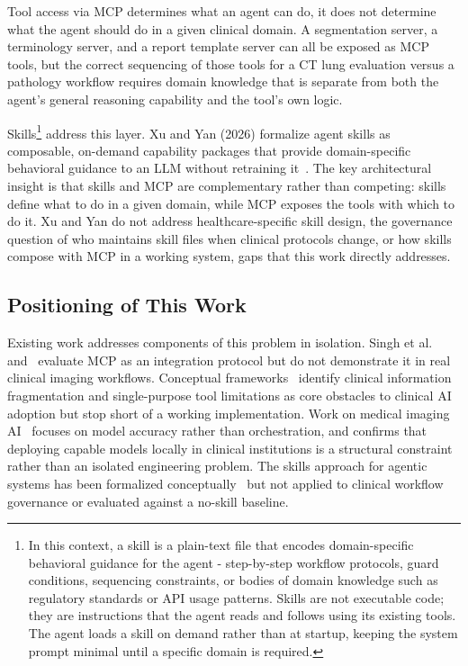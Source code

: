 \documentclass[conference]{IEEEtran}
\begin{document}
Tool access via MCP determines what an agent can do, it does not determine what the agent should do in a given clinical domain. A segmentation server, a terminology server, and a report template server can all be exposed as MCP tools, but the correct sequencing of those tools for a CT lung evaluation versus a pathology workflow requires domain knowledge that is separate from both the agent's general reasoning capability and the tool's own logic.

Skills\footnote{In this context, a skill is a plain-text file that encodes domain-specific behavioral guidance for the agent - step-by-step workflow protocols, guard conditions, sequencing constraints, or bodies of domain knowledge such as regulatory standards or API usage patterns. Skills are not executable code; they are instructions that the agent reads and follows using its existing tools. The agent loads a skill on demand rather than at startup, keeping the system prompt minimal until a specific domain is required.} address this layer. Xu and Yan (2026) formalize agent skills as composable, on-demand capability packages that provide domain-specific behavioral guidance to an LLM without retraining it~\cite{agentskillslargelanguage}. The key architectural insight is that skills and MCP are complementary rather than competing: skills define what to do in a given domain, while MCP exposes the tools with which to do it. Xu and Yan do not address healthcare-specific skill design, the governance question of who maintains skill files when clinical protocols change, or how skills compose with MCP in a working system, gaps that this work directly addresses.

\subsection{Positioning of This Work}

Existing work addresses components of this problem in isolation. Singh et al.~\cite{mcp-aditi} and~\cite{mcphosts2025} evaluate MCP as an integration protocol but do not demonstrate it in real clinical imaging workflows. Conceptual frameworks~\cite{transformingclinical2026} identify clinical information fragmentation and single-purpose tool limitations as core obstacles to clinical AI adoption but stop short of a working implementation. Work on medical imaging AI~\cite{agiformedicalimaging2025} focuses on model accuracy rather than orchestration, and confirms that deploying capable models locally in clinical institutions is a structural constraint rather than an isolated engineering problem. The skills approach for agentic systems has been formalized conceptually~\cite{agentskillslargelanguage} but not applied to clinical workflow governance or evaluated against a no-skill baseline.
\end{document}

